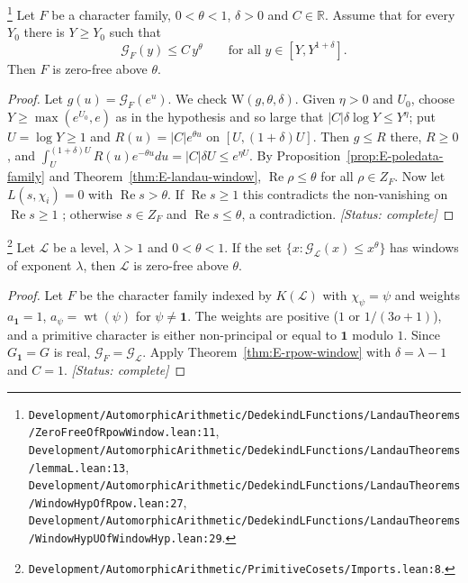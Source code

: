 \begin{theorem}\label{thm:E-rpow-window}
\footnote{\nolinkurl{Development/AutomorphicArithmetic/DedekindLFunctions/LandauTheorems/ZeroFreeOfRpowWindow.lean:11}, \nolinkurl{Development/AutomorphicArithmetic/DedekindLFunctions/LandauTheorems/lemmaL.lean:13}, \nolinkurl{Development/AutomorphicArithmetic/DedekindLFunctions/LandauTheorems/WindowHypOfRpow.lean:27}, \nolinkurl{Development/AutomorphicArithmetic/DedekindLFunctions/LandauTheorems/WindowHypUOfWindowHyp.lean:29}.}%
Let $F$ be a character family, $0<\theta<1$, $\delta>0$ and $C\in\mathbb R$. Assume that for every
$Y_0$ there is $Y\ge Y_0$ such that
\[
\mathcal G_F(y)\le C\,y^{\theta}\qquad\text{for all }y\in[Y,Y^{1+\delta}].
\]
Then $F$ is zero-free above $\theta$.
\end{theorem}
\begin{proof}
Let $g(u)=\mathcal G_F(e^{u})$. We check $\mathrm W(g,\theta,\delta)$. Given $\eta>0$ and $U_0$,
choose $Y\ge\max(e^{U_0},e)$ as in the hypothesis and so large that
$|C|\delta\log Y\le Y^{\eta}$; put $U=\log Y\ge1$ and $R(u)=|C|e^{\theta u}$ on $[U,(1+\delta)U]$.
Then $g\le R$ there, $R\ge0$, and
$\int_U^{(1+\delta)U}R(u)e^{-\theta u}du=|C|\delta U\le e^{\eta U}$. By
Proposition~\ref{prop:E-poledata-family} and Theorem~\ref{thm:E-landau-window},
$\operatorname{Re}\rho\le\theta$ for all $\rho\in Z_F$. Now let $L(s,\chi_i)=0$ with
$\operatorname{Re}s>\theta$. If $\operatorname{Re}s\ge1$ this contradicts the non-vanishing on
$\operatorname{Re}s\ge1$ \cite{E-mathlib-nonvanishing}; otherwise $s\in Z_F$ and
$\operatorname{Re}s\le\theta$, a contradiction.
\textit{[Status: complete]}
\end{proof}

\begin{corollary}\label{cor:E-formB}
\footnote{\nolinkurl{Development/AutomorphicArithmetic/PrimitiveCosets/Imports.lean:8}.}%
Let $\mathcal L$ be a level, $\lambda>1$ and $0<\theta<1$. If the set
$\{x:\mathcal G_{\mathcal L}(x)\le x^{\theta}\}$ has windows of exponent $\lambda$, then
$\mathcal L$ is zero-free above $\theta$.
\end{corollary}
\begin{proof}
Let $F$ be the character family indexed by $K(\mathcal L)$ with $\chi_\psi=\psi$ and weights
$a_{\mathbf 1}=1$, $a_\psi=\operatorname{wt}(\psi)$ for $\psi\neq\mathbf 1$. The weights are
positive ($1$ or $1/(3o+1)$), and a primitive character is either non-principal or equal to
$\mathbf 1$ modulo $1$. Since $G_{\mathbf 1}=G$ is real, $\mathcal G_F=\mathcal G_{\mathcal L}$.
Apply Theorem~\ref{thm:E-rpow-window} with $\delta=\lambda-1$ and $C=1$.
\textit{[Status: complete]}
\end{proof}

